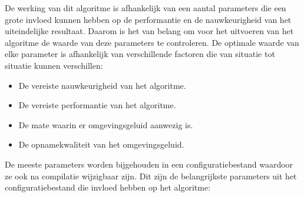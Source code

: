 De werking van dit algoritme is afhankelijk van een aantal parameters die een grote invloed kunnen hebben op de performantie en de nauwkeurigheid van het uiteindelijke resultaat. Daarom is het van belang om voor het uitvoeren van het algoritme de waarde van deze parameters te controleren. De optimale waarde van elke parameter is afhankelijk van verschillende factoren die van situatie tot situatie kunnen verschillen:

\begin{itemize}[noitemsep]
	\item De vereiste nauwkeurigheid van het algoritme.
	\item De vereiste performantie van het algoritme.
	\item De mate waarin er omgevingsgeluid aanwezig is.
	\item De opnamekwaliteit van het omgevingsgeluid.
\end{itemize}

De meeste parameters worden bijgehouden in een configuratiebestand waardoor ze ook na compilatie wijzigbaar zijn. Dit zijn de belangrijkste parameters uit het configuratiebestand die invloed hebben op het algoritme:

